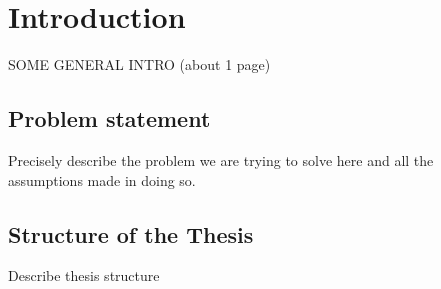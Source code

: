 \chapter{Introduction}
\label{chapter:intro}

SOME GENERAL INTRO (about 1 page)

\section{Problem statement}
Precisely describe the problem we are trying to solve here and all the
assumptions made in doing so.

\section{Structure of the Thesis}
\label{section:structure} 
Describe thesis structure



